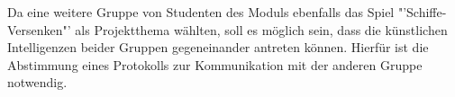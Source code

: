 		Da eine weitere Gruppe von Studenten des Moduls ebenfalls das Spiel "'Schiffe-Versenken"' als Projektthema wählten, soll 
		es möglich sein, dass die künstlichen Intelligenzen beider Gruppen gegeneinander antreten können. 
		Hierfür ist die Abstimmung eines Protokolls zur Kommunikation mit der anderen Gruppe notwendig.
